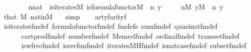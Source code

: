 \begin{isabellebody}
\ \ \ \ \ \ \ \ n{\isasymin}nat\ {\isacharampersand}{\kern0pt}\ is{\isacharunderscore}{\kern0pt}iterates{\isacharparenleft}{\kern0pt}{\isacharhash}{\kern0pt}{\isacharhash}{\kern0pt}M{\isacharcomma}{\kern0pt}\ is{\isacharunderscore}{\kern0pt}formula{\isacharunderscore}{\kern0pt}functor{\isacharparenleft}{\kern0pt}{\isacharhash}{\kern0pt}{\isacharhash}{\kern0pt}M{\isacharparenright}{\kern0pt}{\isacharcomma}{\kern0pt}\ {}{\isacharcomma}{\kern0pt}\ n{\isacharcomma}{\kern0pt}\ y{\isacharparenright}{\kern0pt}{\isachardoublequoteclose}\isanewline
\ \ \ \ \ {\isachardoublequoteopen}n{\isasymin}M{\isachardoublequoteclose}\ {\isachardoublequoteopen}y{\isasymin}M{\isachardoublequoteclose}\ \ n\ y\isanewline
\ \ \ \ \isamarkupfalse%
\ that\ {\isacartoucheopen}{}{\isasymin}M{\isacartoucheclose}\ nat{\isacharunderscore}{\kern0pt}in{\isacharunderscore}{\kern0pt}M\ {}\ \isamarkupfalse%
\ simp\isanewline
\ \ \isamarkupfalse%
\ artyf{\isacharcolon}{\kern0pt}{\isachardoublequoteopen}arity{\isacharparenleft}{\kern0pt}{\isacharquery}{\kern0pt}f{\isacharparenright}{\kern0pt}\ {\isacharequal}{\kern0pt}\ {}{\isachardoublequoteclose}\isanewline
\ \ \ \ \isamarkupfalse%
\ is{\isacharunderscore}{\kern0pt}iterates{\isacharunderscore}{\kern0pt}fm{\isacharunderscore}{\kern0pt}def\ formula{\isacharunderscore}{\kern0pt}functor{\isacharunderscore}{\kern0pt}fm{\isacharunderscore}{\kern0pt}def\ fm{\isacharunderscore}{\kern0pt}defs\ sum{\isacharunderscore}{\kern0pt}fm{\isacharunderscore}{\kern0pt}def\ quasinat{\isacharunderscore}{\kern0pt}fm{\isacharunderscore}{\kern0pt}def\isanewline
\ \ \ \ \ \ cartprod{\isacharunderscore}{\kern0pt}fm{\isacharunderscore}{\kern0pt}def\ number{}{\isacharunderscore}{\kern0pt}fm{\isacharunderscore}{\kern0pt}def\ Memrel{\isacharunderscore}{\kern0pt}fm{\isacharunderscore}{\kern0pt}def\ ordinal{\isacharunderscore}{\kern0pt}fm{\isacharunderscore}{\kern0pt}def\ transset{\isacharunderscore}{\kern0pt}fm{\isacharunderscore}{\kern0pt}def\isanewline
\ \ \ \ \ \ is{\isacharunderscore}{\kern0pt}wfrec{\isacharunderscore}{\kern0pt}fm{\isacharunderscore}{\kern0pt}def\ is{\isacharunderscore}{\kern0pt}recfun{\isacharunderscore}{\kern0pt}fm{\isacharunderscore}{\kern0pt}def\ iterates{\isacharunderscore}{\kern0pt}MH{\isacharunderscore}{\kern0pt}fm{\isacharunderscore}{\kern0pt}def\ is{\isacharunderscore}{\kern0pt}nat{\isacharunderscore}{\kern0pt}case{\isacharunderscore}{\kern0pt}fm{\isacharunderscore}{\kern0pt}def\ subset{\isacharunderscore}{\kern0pt}fm{\isacharunderscore}{\kern0pt}def\isanewline

\end{isabellebody}
